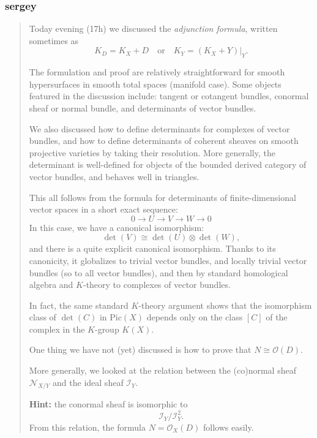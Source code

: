 \subsubsection{sergey}

\begin{quotation}
	Today evening (17h) we discussed the \emph{adjunction formula}, written sometimes as 
\[ K_D = K_X + D \quad \text{or} \quad K_Y = (K_X + Y)|_Y. \]

The formulation and proof are relatively straightforward for smooth hypersurfaces in smooth total spaces (manifold case). Some objects featured in the discussion include: tangent or cotangent bundles, conormal sheaf or normal bundle, and determinants of vector bundles.

We also discussed how to define determinants for complexes of vector bundles, and how to define determinants of coherent sheaves on smooth projective varieties by taking their resolution. More generally, the determinant is well-defined for objects of the bounded derived category of vector bundles, and behaves well in triangles.

This all follows from the formula for determinants of finite-dimensional vector spaces in a short exact sequence:
\[
0 \longrightarrow U \longrightarrow V \longrightarrow W \longrightarrow 0
\]
In this case, we have a canonical isomorphism:
\[
\det(V) \cong \det(U) \otimes \det(W),
\]
and there is a quite explicit canonical isomorphism. Thanks to its canonicity, it globalizes to trivial vector bundles, and locally trivial vector bundles (so to all vector bundles), and then by standard homological algebra and $K$-theory to complexes of vector bundles.

In fact, the same standard $K$-theory argument shows that the isomorphism class of $\det(C)$ in $\mathrm{Pic}(X)$ depends only on the class $[C]$ of the complex in the $K$-group $K(X)$.

\medskip

\noindent One thing we have not (yet) discussed is how to prove that $N \cong \mathcal{O}(D)$.

More generally, we looked at the relation between the (co)normal sheaf $\mathcal{N}_{X/Y}$ and the ideal sheaf $\mathcal{I}_Y$.

\medskip

\noindent \textbf{Hint:} the conormal sheaf is isomorphic to
\[
\mathcal{I}_Y / \mathcal{I}_Y^2.
\]
From this relation, the formula $N = \mathcal{O}_X(D)$ follows easily.
\end{quotation}

